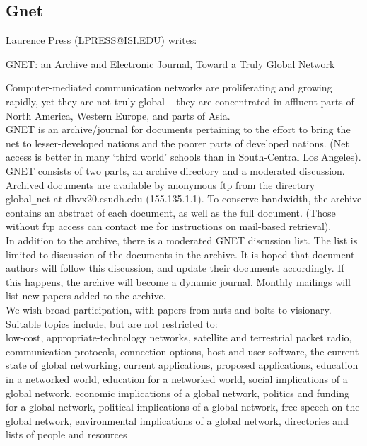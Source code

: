 \subsection{Gnet}
Laurence Press (LPRESS@ISI.EDU) writes:

GNET: an Archive and Electronic Journal, Toward a Truly Global Network

Computer-mediated communication networks are proliferating and 
growing rapidly, yet they are not truly global -- they are 
concentrated in affluent parts of North America, Western Europe, 
and parts of Asia.  \\
GNET is an archive/journal for documents pertaining to the effort 
to bring the net to lesser-developed nations and the poorer parts 
of developed nations.  (Net access is better in many `third 
world' schools than in South-Central Los Angeles).  GNET consists 
of two parts, an archive directory and a moderated discussion.\\
Archived documents are available by anonymous ftp from the 
directory global\verb+_+net at dhvx20.csudh.edu (155.135.1.1).  To 
conserve bandwidth, the archive contains an abstract of each 
document, as well as the full document.  (Those without ftp 
access can contact me for instructions on mail-based retrieval).\\
In addition to the archive, there is a moderated GNET discussion 
list.  The list is limited to discussion of the documents in the 
archive.  It is hoped that document authors will follow this 
discussion, and update their documents accordingly.  If this 
happens, the archive will become a dynamic journal.  Monthly 
mailings will list new papers added to the archive.\\
We wish broad participation, with papers from nuts-and-bolts to 
visionary.  Suitable topics include, but are not restricted to:\\
   low-cost, appropriate-technology networks,
   satellite and terrestrial packet radio,
   communication protocols,
   connection options,
   host and user software,
   the current state of global networking,
   current applications,
   proposed applications,
   education in a networked world,
   education for a networked world,
   social implications of a global network,
   economic implications of a global network,
   politics and funding for a global network,
   political implications of a global network,
   free speech on the global network,
   environmental implications of a global network,
   directories and lists of people and resources


